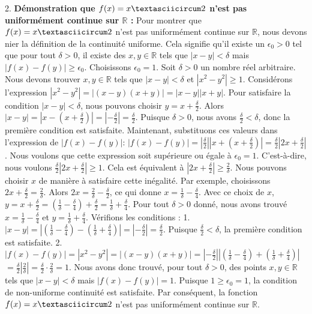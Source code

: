 \documentclass[12pt,a4paper]{report}
\begin{document}
2.  \textbf{Démonstration que $f(x) = x\textasciicircum 2$ n'est pas uniformément continue sur $\mathbb{R}$ :}
    Pour montrer que $f(x) = x\textasciicircum 2$ n'est pas uniformément continue sur $\mathbb{R}$, nous devons nier la définition de la continuité uniforme. Cela signifie qu'il existe un $\epsilon_0 > 0$ tel que pour tout $\delta > 0$, il existe des $x, y \in \mathbb{R}$ tels que $|x - y| < \delta$ mais $|f(x) - f(y)| \ge \epsilon_0$.
    Choisissons $\epsilon_0 = 1$.
    Soit $\delta > 0$ un nombre réel arbitraire. Nous devons trouver $x, y \in \mathbb{R}$ tels que $|x - y| < \delta$ et $|x^2 - y^2| \ge 1$.
    Considérons l'expression $|x^2 - y^2| = |(x - y)(x + y)| = |x - y| |x + y|$.
    Pour satisfaire la condition $|x - y| < \delta$, nous pouvons choisir $y = x + \frac{\delta}{2}$.
    Alors $|x - y| = \left| x - \left(x + \frac{\delta}{2}\right) \right| = \left| -\frac{\delta}{2} \right| = \frac{\delta}{2}$.
    Puisque $\delta > 0$, nous avons $\frac{\delta}{2} < \delta$, donc la première condition est satisfaite.
    Maintenant, substituons ces valeurs dans l'expression de $|f(x) - f(y)|$:
    $|f(x) - f(y)| = \left| \frac{\delta}{2} \right| \left| x + \left(x + \frac{\delta}{2}\right) \right| = \frac{\delta}{2} \left| 2x + \frac{\delta}{2} \right|$.
    Nous voulons que cette expression soit supérieure ou égale à $\epsilon_0 = 1$.
    C'est-à-dire, nous voulons $\frac{\delta}{2} \left| 2x + \frac{\delta}{2} \right| \ge 1$.
    Cela est équivalent à $\left| 2x + \frac{\delta}{2} \right| \ge \frac{2}{\delta}$.
    Nous pouvons choisir $x$ de manière à satisfaire cette inégalité. Par exemple, choisissons $2x + \frac{\delta}{2} = \frac{2}{\delta}$.
    Alors $2x = \frac{2}{\delta} - \frac{\delta}{2}$, ce qui donne $x = \frac{1}{\delta} - \frac{\delta}{4}$.
    Avec ce choix de $x$, $y = x + \frac{\delta}{2} = \left( \frac{1}{\delta} - \frac{\delta}{4} \right) + \frac{\delta}{2} = \frac{1}{\delta} + \frac{\delta}{4}$.
    Pour tout $\delta > 0$ donné, nous avons trouvé $x = \frac{1}{\delta} - \frac{\delta}{4}$ et $y = \frac{1}{\delta} + \frac{\delta}{4}$.
    Vérifions les conditions :
    1.  $|x - y| = \left| \left(\frac{1}{\delta} - \frac{\delta}{4}\right) - \left(\frac{1}{\delta} + \frac{\delta}{4}\right) \right| = \left| -\frac{\delta}{2} \right| = \frac{\delta}{2}$. Puisque $\frac{\delta}{2} < \delta$, la première condition est satisfaite.
    2.  $|f(x) - f(y)| = |x^2 - y^2| = |(x-y)(x+y)| = \left| -\frac{\delta}{2} \right| \left| \left(\frac{1}{\delta} - \frac{\delta}{4}\right) + \left(\frac{1}{\delta} + \frac{\delta}{4}\right) \right|$
        $= \frac{\delta}{2} \left| \frac{2}{\delta} \right| = \frac{\delta}{2} \cdot \frac{2}{\delta} = 1$.
    Nous avons donc trouvé, pour tout $\delta > 0$, des points $x, y \in \mathbb{R}$ tels que $|x - y| < \delta$ mais $|f(x) - f(y)| = 1$.
    Puisque $1 \ge \epsilon_0 = 1$, la condition de non-uniforme continuité est satisfaite.
    Par conséquent, la fonction $f(x) = x\textasciicircum 2$ n'est pas uniformément continue sur $\mathbb{R}$.
\end{document}
